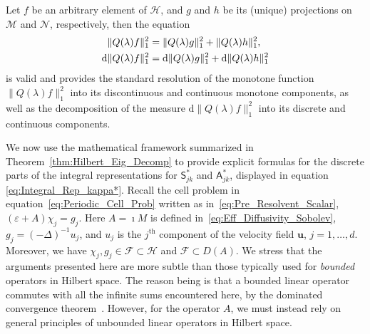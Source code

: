 \documentclass[leqno,onefignum,onetabnum]{siamltex1213}
\newcommand{\thmref}[1]{Theorem~\ref{#1}}
\renewcommand{\d}{\mathrm{d}}
\newcommand{\Mc}{\mathcal{M}}
\newcommand{\Nc}{\mathcal{N}}
\newcommand{\Sm}{\mathsf{S}}
\newcommand{\Am}{\mathsf{A}}
\newcommand{\Hs}{\mathscr{H}}
\newcommand{\Fs}{\mathscr{F}}
\newcommand{\vecu}{\boldsymbol{u}}
\begin{document}
\begin{theorem}
Let $f$ be an arbitrary element of $\Hs$, and $g$ and $h$ be its (unique)
projections on $\Mc$ and $\Nc$, respectively, then the equation
%
\begin{align}\label{eq:Disc_Cont_Measures}
  \|Q(\lambda)f\|_1^2&=\|Q(\lambda)g\|_1^2+\|Q(\lambda)h\|_1^2,
  \\
  \d\|Q(\lambda)f\|_1^2&=\d\|Q(\lambda)g\|_1^2+\d\|Q(\lambda)h\|_1^2
  \notag
\end{align}
%
is valid and provides the standard resolution of the monotone function
$\|Q(\lambda)f\|_1^2$ into its discontinuous and continuous monotone
components, as well as the decomposition of the measure
$\d\|Q(\lambda)f\|_1^2$ into its discrete and continuous components.  
\end{theorem}
%






We now use the mathematical framework summarized in
\thmref{thm:Hilbert_Eig_Decomp} to provide explicit formulas for the
discrete parts of the integral representations for $\Sm^*_{jk}$
and $\Am^*_{jk}$, displayed in equation
\eqref{eq:Integral_Rep_kappa*}. Recall the cell problem
in equation~\eqref{eq:Periodic_Cell_Prob} written as
in~\eqref{eq:Pre_Resolvent_Scalar}, $(\varepsilon+A)\chi_j=g_j$. Here $A=\imath M$ 
is defined in~\eqref{eq:Eff_Diffusivity_Sobolev}, $g_j=(-\Delta)^{-1}u_j$,
and $u_j$ is the $j^{\text{th}}$ component of the velocity field
$\vecu$, $j=1,\ldots,d$. Moreover, we have $\chi_j,g_j\in\Fs\subset\Hs$ and $\Fs\subset
D(A)$. We stress that the arguments presented here are more subtle
than those typically used for \emph{bounded} operators in Hilbert
space. The reason being is that a bounded linear operator commutes with all
the infinite sums encountered here, by the dominated convergence
theorem~\cite{Folland:99:RealAnalysis}. However, for the operator $A$,
we must instead rely on general principles of unbounded linear operators in
Hilbert space.  
\end{document}
